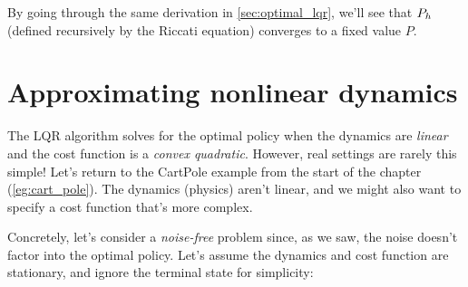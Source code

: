 \documentclass[../main/main]{subfiles}
\begin{document}
By going through the same derivation in \autoref{sec:optimal_lqr}, we'll see that $P_h$ (defined recursively by the Riccati equation) converges to a fixed value $P$.

\fi

\section{Approximating nonlinear dynamics} \label{sec:approx_nonlinear}

The LQR algorithm solves for the optimal policy when the dynamics are \emph{linear} and the cost function is a \emph{convex quadratic}.
However, real settings are rarely this simple!
Let's return to the CartPole example from the start of the chapter (\autoref{eg:cart_pole}).
The dynamics (physics) aren't linear, and we might also want to specify a cost function that's more complex.

Concretely, let's consider a \emph{noise-free} problem since, as we saw, the noise doesn't factor into the optimal policy. Let's assume the dynamics and cost function are stationary, and ignore the terminal state for simplicity:
\end{document}
